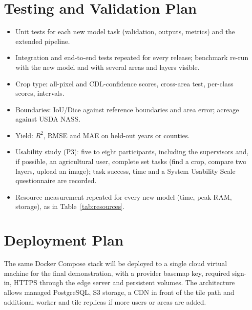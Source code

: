 \section{Testing and Validation Plan}
\begin{itemize}
  \item Unit tests for each new model task (validation, outputs, metrics) and the extended pipeline.
  \item Integration and end-to-end tests repeated for every release; benchmark re-run with the new
        model and with several areas and layers visible.
  \item Crop type: all-pixel and CDL-confidence scores, cross-area test, per-class scores, intervals.
  \item Boundaries: IoU/Dice against reference boundaries and area error; acreage against USDA NASS.
  \item Yield: $R^2$, RMSE and MAE on held-out years or counties.
  \item Usability study (P3): five to eight participants, including the supervisors and, if
        possible, an agricultural user, complete set tasks (find a crop, compare two layers, upload
        an image); task success, time and a System Usability Scale questionnaire are recorded.
  \item Resource measurement repeated for every new model (time, peak RAM, storage), as in
        Table~\ref{tab:resources}.
\end{itemize}

\section{Deployment Plan}
The same Docker Compose stack will be deployed to a single cloud virtual machine for the final
demonstration, with a provider basemap key, required sign-in, HTTPS through the edge server and
persistent volumes. The architecture allows managed PostgreSQL, S3 storage, a CDN in front of the
tile path and additional worker and tile replicas if more users or areas are added.

